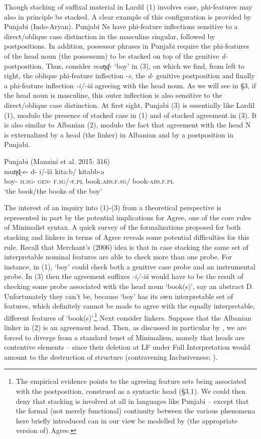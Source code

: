 \documentclass[output=paper]{langsci/langscibook}
\begin{document}
Though stacking of suffixal material in Lardil (1) involves case, phi-features may also in principle be stacked. A clear example of this configuration is provided by Punjabi (Indo-Aryan). Punjabi Ns have phi-feature inflections sensitive to a direct/oblique case distinction in the masculine singular, followed by postpositions. In addition, possessor phrases in Punjabi require the phi-features of the head noun (the possessum) to be stacked on top of the genitive \textit{d-} postposition. Thus, consider \textit{muɳɖ}{}- ‘boy’ in (3), on which we find, from left to right, the oblique phi-feature inflection -\textit{e}, the \textit{d-} genitive postposition and finally a phi-feature inflection \textit{{}-}\textit{i/-ĩã} agreeing with the head noun. As we will see in §3, if the head noun is masculine, this outer inflection is also sensitive to the direct/oblique case distinction. At first sight, Punjabi (3) is essentially like Lardil (1), modulo the presence of stacked case in (1) and of stacked agreement in (3). It is also similar to Albanian (2), modulo the fact that agreement with the head N is externalized by a head (the linker) in Albanian and by a postposition in Punjabi. 

\ea%
Punjabi (Manzini et al. 2015: 316)\\
\gll muɳɖ-e-  d-  i/-ĩã    kita:b/      kitabb-a\\
     boy-  \textsc{m.sg-  gen-  f.sg/-f.pl}  book.\textsc{abs.f.sg}/   book-\textsc{abs.f.pl}\\
\glt ‘the book/the books of the boy’
\z

The interest of an inquiry into (1)-(3) from a theoretical perspective is represented in part by the potential implications for Agree, one of the core rules of Minimalist syntax. A quick survey of the formalizations proposed for both stacking and linkers in terms of Agree reveals some potential difficulties for this rule. Recall that Merchant’s (2006) idea is that in case stacking the same set of interpretable nominal features are able to check more than one probe. For instance, in (1), ‘boy’ could check both a genitive case probe and an instrumental probe. In (3) then the agreement suffixes \textit{{}-}\textit{i/-ĩã} would have to be the result of checking some probe associated with the head noun ‘book(s)’, say an abstract D. Unfortunately they can’t be, because ‘boy’ has its own interpretable set of features, which definitely cannot be made to agree with the equally interpretable, different features of ‘book(s)’.\footnote{The empirical evidence points to the agreeing feature sets being associated with the postposition, construed as a syntactic head (§3.1). We could then deny that stacking is involved at all in languages like Punjabi – except that the formal (not merely functional) continuity between the various phenomena here briefly introduced can in our view be modelled by (the appropriate version of) Agree.} Next consider linkers. Suppose that the Albanian linker in (2) is an agreement head. Then, as discussed in particular by \citet{Philip2012}, we are forced to diverge from a standard tenet of Minimalism, namely that heads are contentive elements – since their deletion at LF under Full Interpretation would amount to the destruction of structure (contravening Inclusiveness; \citealt{Chomsky1995}). 
\end{document}
